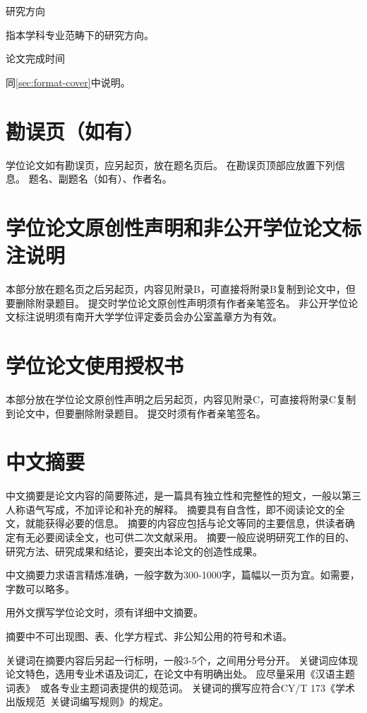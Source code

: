 {\heiti 研究方向}

指本学科专业范畴下的研究方向。

{\heiti 论文完成时间}

同\ref{sec:format-cover}中说明。

\section{勘误页（如有）}

学位论文如有勘误页，应另起页，放在题名页后。
在勘误页顶部应放置下列信息。
题名、副题名（如有）、作者名。

\section{学位论文原创性声明和非公开学位论文标注说明}

本部分放在题名页之后另起页，内容见附录B，可直接将附录B复制到论文中，但要删除附录题目。
提交时学位论文原创性声明须有作者亲笔签名。
非公开学位论文标注说明须有南开大学学位评定委员会办公室盖章方为有效。

\section{学位论文使用授权书}

本部分放在学位论文原创性声明之后另起页，内容见附录C，可直接将附录C复制到论文中，但要删除附录题目。
提交时须有作者亲笔签名。

\section{中文摘要}

中文摘要是论文内容的简要陈述，是一篇具有独立性和完整性的短文，一般以第三人称语气写成，不加评论和补充的解释。
摘要具有自含性，即不阅读论文的全文，就能获得必要的信息。
摘要的内容应包括与论文等同的主要信息，供读者确定有无必要阅读全文，也可供二次文献采用。
摘要一般应说明研究工作的目的、研究方法、研究成果和结论，要突出本论文的创造性成果。

中文摘要力求语言精炼准确，一般字数为300-1000字，篇幅以一页为宜。如需要，字数可以略多。

用外文撰写学位论文时，须有详细中文摘要。

摘要中不可出现图、表、化学方程式、非公知公用的符号和术语。

关键词在摘要内容后另起一行标明，一般3-5个，之间用分号分开。
关键词应体现论文特色，选用专业术语及词汇，在论文中有明确出处。
应尽量采用《汉语主题词表》~\cite{REF00000003}或各专业主题词表提供的规范词。
关键词的撰写应符合CY/T 173《学术出版规范~关键词编写规则》的规定。

